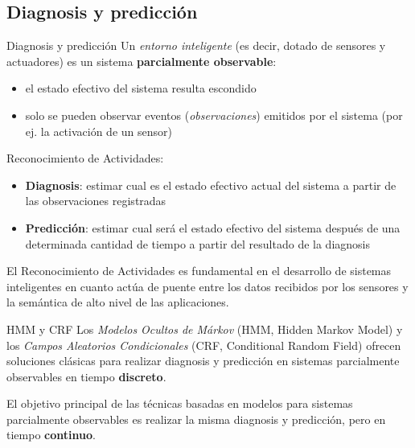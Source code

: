\documentclass[9pt]{beamer}
\begin{document}
    \subsection{Diagnosis y predicción}
      \begin{frame}{Diagnosis y predicción}
        \pause
        Un \textit{entorno inteligente} (es decir, dotado de sensores y actuadores) es un sistema \textbf{parcialmente observable}:
        \pause
        \begin{itemize}
          \item el estado efectivo del sistema resulta escondido
          \pause
          \item solo se pueden observar eventos (\textit{observaciones}) emitidos por el sistema (por ej. la activación de un sensor)\\[1.5em]
        \end{itemize}
        
        \pause
        
        Reconocimiento de Actividades:
        \pause
        \begin{itemize}
          \item \textbf{Diagnosis}: estimar cual es el estado efectivo actual del sistema a partir de las observaciones registradas
          \pause
          \item \textbf{Predicción}: estimar cual será el estado efectivo del sistema después de una determinada cantidad de tiempo a partir del resultado de la diagnosis\\[1.5em]
        \end{itemize}
        
        \pause
        
        El Reconocimiento de Actividades es fundamental en el desarrollo de sistemas inteligentes en cuanto actúa de puente entre los datos recibidos por los sensores y la semántica de alto nivel de las aplicaciones.
        
      \end{frame}
      
      \begin{frame}{HMM y CRF}
        \pause
        Los \textit{Modelos Ocultos de Márkov} (HMM, Hidden Markov Model) y los \textit{Campos Aleatorios Condicionales} (CRF, Conditional Random Field) ofrecen soluciones clásicas para realizar diagnosis y predicción en sistemas parcialmente observables en tiempo \textbf{discreto}.\\[1.5em]
        
        \pause
        
        El objetivo principal de las técnicas basadas en modelos para sistemas parcialmente observables es realizar la misma diagnosis y predicción, pero en tiempo \textbf{continuo}.
      \end{frame}
      
\end{document}

